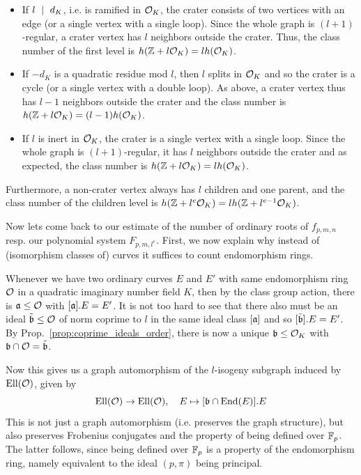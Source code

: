 \begin{itemize}
    \item If $l \ \mid \  d_K$, i.e. is ramified in $\mathcal{O}_K$, the crater consists of two vertices with an edge (or a single vertex with a single loop).
    Since the whole graph is $(l + 1)$-regular, a crater vertex has $l$ neighbors outside the crater.
    Thus, the class number of the first level is $h(\mathbb{Z} + l\mathcal{O}_K) = lh(\mathcal{O}_K)$.
    \item If $-d_K$ is a quadratic residue mod $l$, then $l$ splits in $\mathcal{O}_K$ and so the crater is a cycle (or a single vertex with a double loop).
    As above, a crater vertex thus has $l - 1$ neighbors outside the crater and the class number is $h(\mathbb{Z} + l\mathcal{O}_K) = (l - 1)h(\mathcal{O}_K)$.
    \item If $l$ is inert in $\mathcal{O}_K$, the crater is a single vertex with a single loop.
    Since the whole graph is $(l + 1)$-regular, it has $l$ neighbors outside the crater and as expected, the class number is $h(\mathbb{Z} + l\mathcal{O}_K) = l h(\mathcal{O}_K)$.
\end{itemize}
Furthermore, a non-crater vertex always has $l$ children and one parent, and the class number of the children level is $h(\mathbb{Z} + l^e\mathcal{O}_K) = l h(\mathbb{Z} + l^{e - 1}\mathcal{O}_K)$.

Now lets come back to our estimate of the number of ordinary roots of $f_{p, m, n}$ resp. our polynomial system $F_{p, m, l^e}$.
First, we now explain why instead of (isomorphism classes of) curves it suffices to count endomorphism rings.

Whenever we have two ordinary curves $E$ and $E'$ with same endomorphism ring $\mathcal{O}$ in a quadratic imaginary number field $K$, then by the class group action, there is $\mathfrak{a} \leq \mathcal{O}$ with $[\mathfrak{a}].E = E'$.
It is not too hard to see that there also must be an ideal $\tilde{\mathfrak{b}} \leq \mathcal{O}$ of norm coprime to $l$ in the same ideal class $[\mathfrak{a}]$ and so $[\tilde{\mathfrak{b}}].E = E'$.
By Prop.~\ref{prop:coprime_ideals_order}, there is now a unique $\mathfrak{b} \leq \mathcal{O}_K$ with $\mathfrak{b} \cap \mathcal{O} = \tilde{\mathfrak{b}}$.

Now this gives us a graph automorphism of the $l$-isogeny subgraph induced by $\mathrm{Ell}(\mathcal{O})$, given by
\begin{equation*}
    \mathrm{Ell}(\mathcal{O}) \to \mathrm{Ell}(\mathcal{O}), \quad E \mapsto [\mathfrak{b} \cap \mathrm{End}(E)].E
\end{equation*}
This is not just a graph automorphism (i.e. preserves the graph structure), but also preserves Frobenius conjugates and the property of being defined over $\mathbb{F}_p$.
The latter follows, since being defined over $\mathbb{F}_p$ is a property of the endomorphism ring, namely equivalent to the ideal $(p, \pi)$ being principal.

